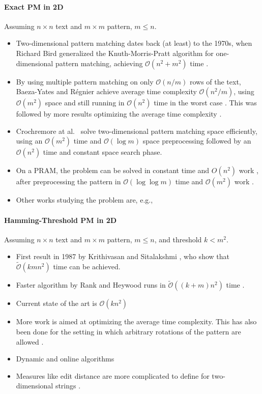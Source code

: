 \documentclass[11pt]{article}
\renewcommand{\O}{\mathcal{O}}
\newcommand{\tO}{\tilde{\mathcal{O}}}
\theoremstyle{plain}
\theoremstyle{definition}
\theoremstyle{remark}
\newcommand{\jonas}[2][]{\todo[color=green!40, #1]{\textbf{J:} #2}}
\begin{document}
\paragraph{Exact PM in 2D}

Assuming $n \times n$ text and $m \times m$ pattern, $m \leq n$.

\begin{itemize}
	\item Two-dimensional pattern matching dates back (at least) to the 1970s, when Richard Bird generalized the Knuth-Morris-Pratt algorithm \cite{Knuth1977} for one-dimensional pattern matching, achieving $\O(n^2 + m^2)$ time \cite{Bird1977}.
	\item By using multiple pattern matching on only $\O(n/m)$ rows of the text, Baeza-Yates and Régnier achieve average time complexity $\O(n^2 / m)$, using $\O(m^2)$ space and still running in $\O(n^2)$ time in the worst case \cite{Baeza-Yates1993}. This was followed by more results optimizing the average time complexity \cite{Tarhio1996,Kaerkkaeinen1999}.
	\item Crochremore at al.\ \cite{Crochemore1995} solve two-dimensional pattern matching space efficiently, using an $\O(m^2)$ time and $\O(\log m)$ space preprocessing followed by an $\O(n^2)$ time and constant space search phase.
	\item On a PRAM, the problem can be solved in constant time and $O(n^2)$ work \cite{Crochemore1998}, after preprocessing the pattern in $\O(\log \log m)$ time and $\O(m^2)$ work \cite{Cole1993}.
	\item Other works studying the problem are, e.g., \cite{Baker1978,Karp1987,Zhu1988,Zhu1989,Amir1994,Galil1996}
\end{itemize}


\paragraph{Hamming-Threshold PM in 2D} Assuming $n \times n$ text and $m \times m$ pattern, $m \leq n$, and threshold $k < m^2$.

\begin{itemize}
	\item First result in 1987 by Krithivasan and Sitalakshmi \cite{Krithivasan1987}, who show that $\tO(kmn^2)$ time can be achieved.
	\item Faster algorithm by Rank and Heywood runs in $\tO((k+m)n^2)$ time \cite{Ranka1991}.
	\item Current state of the art\jonas{check} is $\O(kn^2)$ \cite{Amir1991}
	\item More work \cite{Baeza-Yates1998,Park1998,Kaerkkaeinen1999} is aimed at optimizing the average time complexity. This has also been done for the setting in which arbitrary rotations of the pattern are allowed \cite{Fredriksson2002}.
	\item Dynamic and online algorithms \cite{Clifford2016}
	\item Measures like edit distance are more complicated to define for two-dimensional strings \cite{Baeza-Yates1998a}.
\end{itemize}
\end{document}
